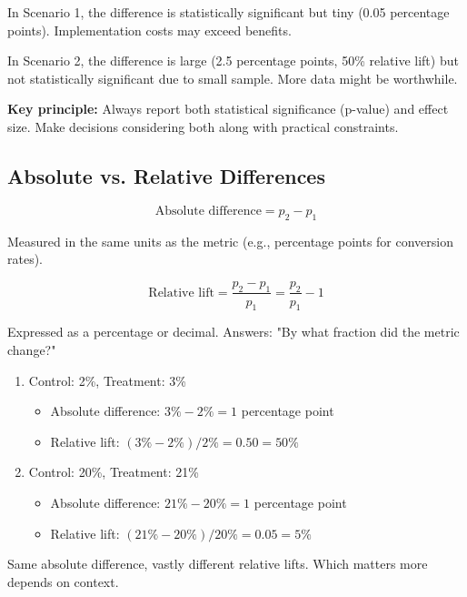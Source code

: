 In Scenario 1, the difference is statistically significant but tiny (0.05 percentage points). Implementation costs may exceed benefits.

In Scenario 2, the difference is large (2.5 percentage points, 50\% relative lift) but not statistically significant due to small sample. More data might be worthwhile.

\textbf{Key principle:} Always report both statistical significance (p-value) and effect size. Make decisions considering both along with practical constraints.

\subsection{Absolute vs. Relative Differences}

\begin{definition}
\begin{equation}
\text{Absolute difference} = p_2 - p_1
\end{equation}

Measured in the same units as the metric (e.g., percentage points for conversion rates).
\end{definition}

\begin{definition}
\begin{equation}
\text{Relative lift} = \frac{p_2 - p_1}{p_1} = \frac{p_2}{p_1} - 1
\end{equation}

Expressed as a percentage or decimal. Answers: "By what fraction did the metric change?"
\end{definition}

\begin{example}
\begin{enumerate}
    \item Control: 2\%, Treatment: 3\%
    \begin{itemize}
        \item Absolute difference: $3\% - 2\% = 1$ percentage point
        \item Relative lift: $(3\% - 2\%)/2\% = 0.50 = 50\%$
    \end{itemize}

    \item Control: 20\%, Treatment: 21\%
    \begin{itemize}
        \item Absolute difference: $21\% - 20\% = 1$ percentage point
        \item Relative lift: $(21\% - 20\%)/20\% = 0.05 = 5\%$
    \end{itemize}
\end{enumerate}

Same absolute difference, vastly different relative lifts. Which matters more depends on context.
\end{example}

